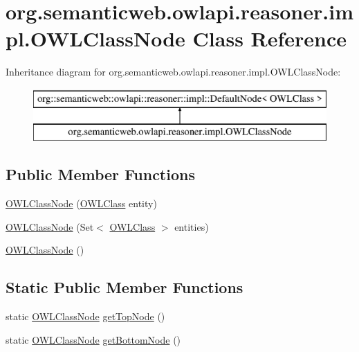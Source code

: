 \hypertarget{classorg_1_1semanticweb_1_1owlapi_1_1reasoner_1_1impl_1_1_o_w_l_class_node}{\section{org.\-semanticweb.\-owlapi.\-reasoner.\-impl.\-O\-W\-L\-Class\-Node Class Reference}
\label{classorg_1_1semanticweb_1_1owlapi_1_1reasoner_1_1impl_1_1_o_w_l_class_node}
}
Inheritance diagram for org.\-semanticweb.\-owlapi.\-reasoner.\-impl.\-O\-W\-L\-Class\-Node\-:\begin{figure}[H]
\begin{center}
\leavevmode
\includegraphics[height=2.000000cm]{classorg_1_1semanticweb_1_1owlapi_1_1reasoner_1_1impl_1_1_o_w_l_class_node}
\end{center}
\end{figure}
\subsection*{Public Member Functions}
\begin{DoxyCompactItemize}
\item 
\hyperlink{classorg_1_1semanticweb_1_1owlapi_1_1reasoner_1_1impl_1_1_o_w_l_class_node_a257cf4b388f6fcbb55ba1b7ffb71dc07}{O\-W\-L\-Class\-Node} (\hyperlink{interfaceorg_1_1semanticweb_1_1owlapi_1_1model_1_1_o_w_l_class}{O\-W\-L\-Class} entity)
\item 
\hyperlink{classorg_1_1semanticweb_1_1owlapi_1_1reasoner_1_1impl_1_1_o_w_l_class_node_ab51ca926d45fca8a63700e882828a543}{O\-W\-L\-Class\-Node} (Set$<$ \hyperlink{interfaceorg_1_1semanticweb_1_1owlapi_1_1model_1_1_o_w_l_class}{O\-W\-L\-Class} $>$ entities)
\item 
\hyperlink{classorg_1_1semanticweb_1_1owlapi_1_1reasoner_1_1impl_1_1_o_w_l_class_node_a83e0285d84e43c9440e60ea264212623}{O\-W\-L\-Class\-Node} ()
\end{DoxyCompactItemize}
\subsection*{Static Public Member Functions}
\begin{DoxyCompactItemize}
\item 
static \hyperlink{classorg_1_1semanticweb_1_1owlapi_1_1reasoner_1_1impl_1_1_o_w_l_class_node}{O\-W\-L\-Class\-Node} \hyperlink{classorg_1_1semanticweb_1_1owlapi_1_1reasoner_1_1impl_1_1_o_w_l_class_node_ad6fd77f466748e21467afb896b4ac78f}{get\-Top\-Node} ()
\item 
static \hyperlink{classorg_1_1semanticweb_1_1owlapi_1_1reasoner_1_1impl_1_1_o_w_l_class_node}{O\-W\-L\-Class\-Node} \hyperlink{classorg_1_1semanticweb_1_1owlapi_1_1reasoner_1_1impl_1_1_o_w_l_class_node_aec11e92953ced83fb1075ba6e1d36811}{get\-Bottom\-Node} ()
\end{DoxyCompactItemize}

